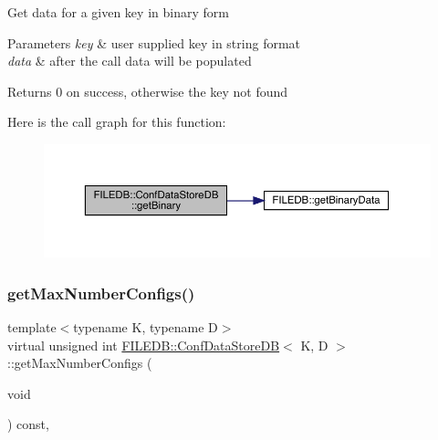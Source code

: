 Get data for a given key in binary form


\begin{DoxyParams}{Parameters}
{\em key} & user supplied key in string format \\
\hline
{\em data} & after the call data will be populated \\
\hline
\end{DoxyParams}
\begin{DoxyReturn}{Returns}
0 on success, otherwise the key not found 
\end{DoxyReturn}
Here is the call graph for this function\+:
\nopagebreak
\begin{figure}[H]
\begin{center}
\leavevmode
\includegraphics[width=350pt]{d8/d19/classFILEDB_1_1ConfDataStoreDB_a971e372585c497dad3b1bc589bc4dd15_cgraph}
\end{center}
\end{figure}
\mbox{\label{classFILEDB_1_1ConfDataStoreDB_a89337b5034d8f87b4a37ceb05ea99d3a}} 
\subsubsection{\texorpdfstring{getMaxNumberConfigs()}{getMaxNumberConfigs()}\hspace{0.1cm}{\footnotesize\ttfamily [1/3]}}
{\footnotesize\ttfamily template$<$typename K, typename D$>$ \\
virtual unsigned int \mbox{\hyperlink{classFILEDB_1_1ConfDataStoreDB}{F\+I\+L\+E\+D\+B\+::\+Conf\+Data\+Store\+DB}}$<$ K, D $>$\+::get\+Max\+Number\+Configs (\begin{DoxyParamCaption}\item[{void}]{ }\end{DoxyParamCaption}) const\hspace{0.3cm}{\ttfamily [inline]}, {\ttfamily [virtual]}}


